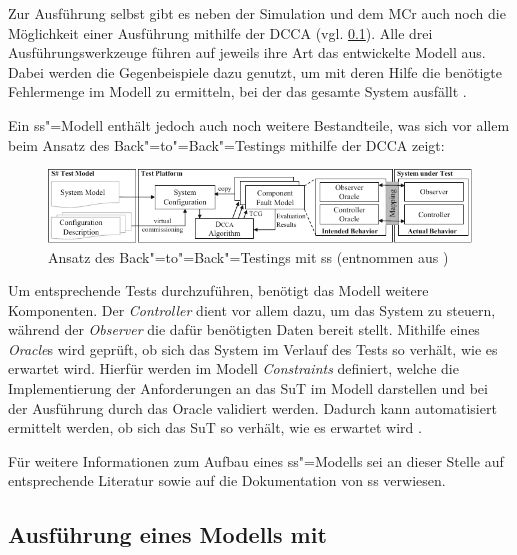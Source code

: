 Zur Ausführung selbst gibt es neben der Simulation und dem \gls{MCr} auch noch die Möglichkeit einer Ausführung mithilfe der \gls{DCCA} (vgl. \cref{subsec:ssharpExecution}).
Alle drei Ausführungswerkzeuge führen auf jeweils ihre Art das entwickelte Modell aus.
Dabei werden die Gegenbeispiele dazu genutzt, um mit deren Hilfe die benötigte Fehlermenge im Modell zu ermitteln, bei der das gesamte System ausfällt \cite{Habermaier2016}.

Ein \gls{ss}"=Modell enthält jedoch auch noch weitere Bestandteile, was sich vor allem beim Ansatz des Back"=to"=Back"=Testings mithilfe der \gls{DCCA} zeigt:

\begin{figure}[h]
    \includegraphics[width=\columnwidth]{./resources/b2bTestApproach.pdf}
    \caption[Ansatz des Back"=to"=Back"=Testings mit ]
    {Ansatz des Back"=to"=Back"=Testings mit \gls{ss} (entnommen aus \cite{Eberhardinger2016})}
    \label{fig:ssharpB2BTesting}
\end{figure}

Um entsprechende Tests durchzuführen, benötigt das Modell weitere Komponenten.
Der \emph{Controller} dient vor allem dazu, um das System zu steuern, während der \emph{Observer} die dafür benötigten Daten bereit stellt.
Mithilfe eines \emph{Oracle}s wird geprüft, ob sich das System im Verlauf des Tests so verhält, wie es erwartet wird.
Hierfür werden im Modell \emph{Constraints} definiert, welche die Implementierung der Anforderungen an das \gls{SuT} im Modell darstellen und bei der Ausführung durch das Oracle validiert werden.
Dadurch kann automatisiert ermittelt werden, ob sich das \gls{SuT} so verhält, wie es erwartet wird \cite{Eberhardinger2016,Habermaier2015}.

Für weitere Informationen zum Aufbau eines \gls{ss}"=Modells sei an dieser Stelle auf entsprechende Literatur \cite{Eberhardinger2016,Habermaier2015,Habermaier2016} sowie auf die Dokumentation von \gls{ss} \cite{SSWiki} verwiesen.

\subsection{Ausführung eines Modells mit }
\label{subsec:ssharpExecution}

